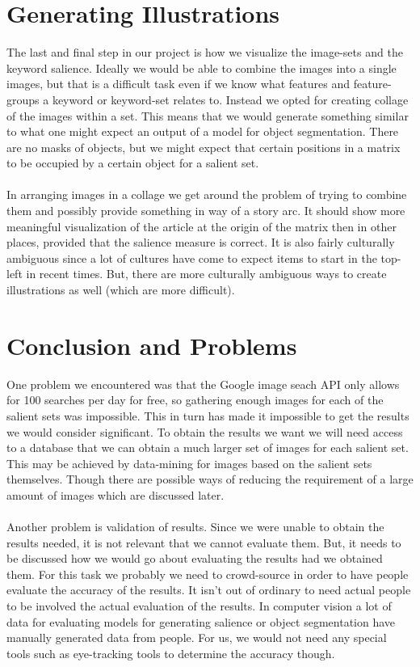\documentclass[12pt]{article}
\begin{document}
\section{Generating Illustrations}
The last and final step in our project is how we visualize the image-sets and the keyword salience. Ideally we 
would be able to combine the images into a single images, but that is a difficult task even if we know what 
features and feature-groups a keyword or keyword-set relates to. Instead we opted for creating collage of the 
images within a set. This means that we would generate something similar to what one might expect an output of 
a model for object segmentation. There are no masks of objects, but we might expect that certain positions in 
a matrix to be occupied by a certain object for a salient set.
\paragraph{}
In arranging images in a collage we get around the problem of trying to combine them and possibly provide 
something in way of a story arc. It should show more meaningful visualization of the article at the origin of 
the matrix then in other places, provided that the salience measure is correct. It is also fairly culturally 
ambiguous since a lot of cultures have come to expect items to start in the top-left in recent times. But, 
there are more culturally ambiguous ways to create illustrations as well (which are more difficult).

\section{Conclusion and Problems}
One problem we encountered was that the Google image seach API only allows for 100 searches per day for free, so 
gathering enough images for each of the salient sets was impossible. This in turn has made it impossible to 
get the results we would consider significant. To obtain the results we want we will need access to a database 
that we can obtain a much larger set of images for each salient set. This may be achieved by data-mining for
images based on the salient sets themselves. Though there are possible ways of reducing the requirement of a
large amount of images which are discussed later.
\paragraph{}
Another problem is validation of results. Since we were unable to obtain the results needed, it is not relevant
that we cannot evaluate them. But, it needs to be discussed how we would go about evaluating the results had 
we obtained them. For this task we probably we need to crowd-source in order to have people evaluate the accuracy 
of the results. It isn't out of ordinary to need actual people to be involved the actual evaluation of the results. 
In computer vision a lot of data for evaluating models for generating salience or object segmentation have manually 
generated data from people. For us, we would not need any special tools such as eye-tracking tools to determine 
the accuracy though.
\end{document}

